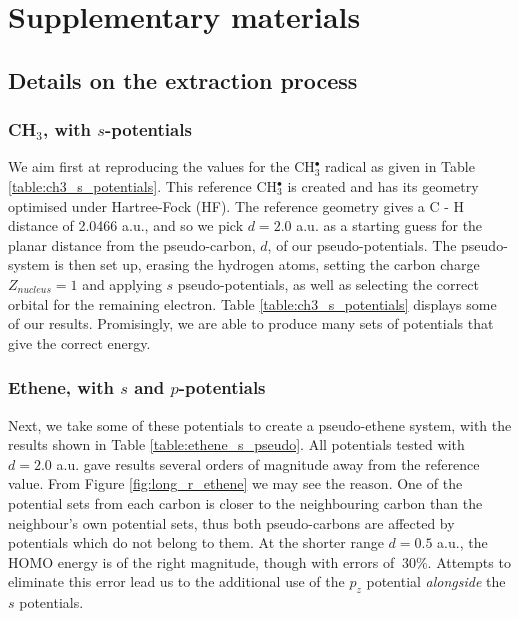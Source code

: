 \documentclass[aip,reprint]{revtex4-1}
\begin{document}


\clearpage
\section{Supplementary materials}
\subsection{Details on the extraction process}
\subsubsection{CH\(_{3}\), with \(s\)-potentials}

We aim first at reproducing the values for the CH\(^{\bullet}_{3}\) radical as given in Table \ref{table:ch3_s_potentials}. 
This reference CH\(^{\bullet}_{3}\) is created and has its geometry optimised under Hartree-Fock (HF). The reference geometry gives a C - H distance of 2.0466 a.u., and so we pick \(d = 2.0\) a.u. as a starting guess for the planar distance from the pseudo-carbon, \(d\), of our pseudo-potentials. The pseudo-system is then set up, erasing the hydrogen atoms, setting the carbon charge \(Z_{nucleus} = 1\) and applying \(s\) pseudo-potentials, as well as selecting the correct orbital for the remaining electron. Table \ref{table:ch3_s_potentials} displays some of our results. Promisingly, we are able to produce many sets of potentials that give the correct energy.

\subsubsection{Ethene, with \(s\) and \(p\)-potentials}

Next, we take some of these potentials to create a pseudo-ethene system, with the results shown in Table \ref{table:ethene_s_pseudo}. All potentials tested with \(d = 2.0\) a.u. gave results several orders of magnitude away from the reference value. From Figure \ref{fig:long_r_ethene} we may see the reason. One of the potential sets from each carbon is closer to the neighbouring carbon than the neighbour's own potential sets, thus both pseudo-carbons are affected by potentials which do not belong to them. At the shorter range \(d = 0.5\) a.u., the HOMO energy is of the right magnitude, though with errors of \(~ 30\%\). Attempts to eliminate this error lead us to the additional use of the \(p_{z}\) potential \textit{alongside} the \(s\) potentials.
\end{document}
